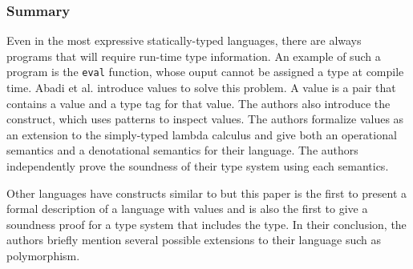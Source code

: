 \documentclass[letterpaper]{llncs}
\begin{document}
\subsubsection*{Summary}

Even in the most expressive statically-typed languages, there are always programs that will require run-time type information. An example of such a program is the \texttt{eval} function, whose ouput cannot be assigned a type at compile time. Abadi et al. introduce \Dynamic values to solve this problem. A \Dynamic value is a pair that contains a value and a type tag for that value. The authors also introduce the \typecase construct, which uses patterns to inspect \Dynamic values. The authors formalize \Dynamic values as an extension to the simply-typed lambda calculus and give both an operational semantics and a denotational semantics for their language. The authors independently prove the soundness of their type system using each semantics.

Other languages have constructs similar to \Dynamic but this paper is the first to present a formal description of a language with \Dynamic values and is also the first to give a soundness proof for a type system that includes the \Dynamic type. In their conclusion, the authors briefly mention several possible extensions to their language such as polymorphism.
\end{document}
